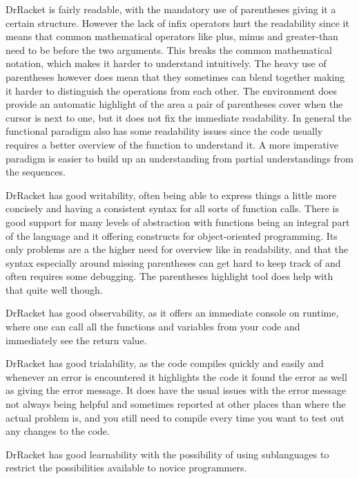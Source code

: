 \begin{description}[style=nextline]
\item[Readability] DrRacket is fairly readable, with the mandatory use of parentheses giving it a certain structure.
However the lack of infix operators hurt the readability since it means that common mathematical operators like plus, minus and greater-than need to be before the two arguments.
This breaks the common mathematical notation, which makes it harder to understand intuitively.
The heavy use of parentheses however does mean that they sometimes can blend together making it harder to distinguish the operations from each other.
The environment does provide an automatic highlight of the area a pair of parentheses cover when the cursor is next to one, but it does not fix the immediate readability.
In general the functional paradigm also has some readability issues since the code usually requires a better overview of the function to understand it.
A more imperative paradigm is easier to build up an understanding from partial understandings from the sequences.
\item[Writability] DrRacket has good writability, often being able to express things a little more concisely and having a consistent syntax for all sorts of function calls.
There is good support for many levels of abstraction with functions being an integral part of the language and it offering constructs for object-oriented programming.
Its only problems are a the higher need for overview like in readability, and that the syntax especially around missing parentheses can get hard to keep track of and often requires some debugging.
The parentheses highlight tool does help with that quite well though.
\item[Observability] DrRacket has good observability, as it offers an immediate console on runtime, where one can call all the functions and variables from your code and immediately see the return value.
\item[Trialability] DrRacket has good trialability, as the code compiles quickly and easily and whenever an error is encountered it highlights the code it found the error as well as giving the error message.
It does have the usual issues with the error message not always being helpful and sometimes reported at other places than where the actual problem is, and you still need to compile every time you want to test out any changes to the code.
\item[Learnability] DrRacket has good learnability with the possibility of using sublanguages to restrict the possibilities available to novice programmers.

\end{description}
